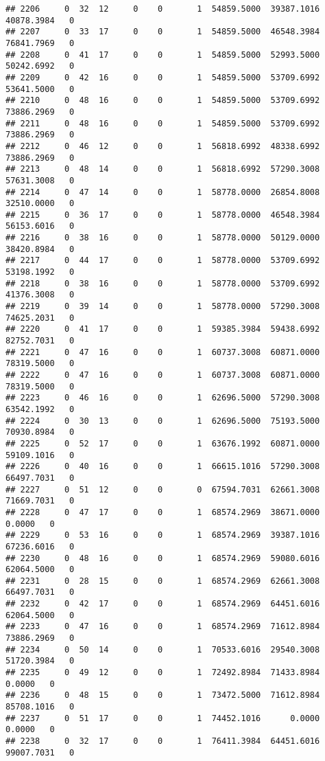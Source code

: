 \documentclass[
]{article}
\begin{document}
\begin{enumerate}
\begin{verbatim}
## 2206     0  32  12     0    0       1  54859.5000  39387.1016  40878.3984   0
## 2207     0  33  17     0    0       1  54859.5000  46548.3984  76841.7969   0
## 2208     0  41  17     0    0       1  54859.5000  52993.5000  50242.6992   0
## 2209     0  42  16     0    0       1  54859.5000  53709.6992  53641.5000   0
## 2210     0  48  16     0    0       1  54859.5000  53709.6992  73886.2969   0
## 2211     0  48  16     0    0       1  54859.5000  53709.6992  73886.2969   0
## 2212     0  46  12     0    0       1  56818.6992  48338.6992  73886.2969   0
## 2213     0  48  14     0    0       1  56818.6992  57290.3008  57631.3008   0
## 2214     0  47  14     0    0       1  58778.0000  26854.8008  32510.0000   0
## 2215     0  36  17     0    0       1  58778.0000  46548.3984  56153.6016   0
## 2216     0  38  16     0    0       1  58778.0000  50129.0000  38420.8984   0
## 2217     0  44  17     0    0       1  58778.0000  53709.6992  53198.1992   0
## 2218     0  38  16     0    0       1  58778.0000  53709.6992  41376.3008   0
## 2219     0  39  14     0    0       1  58778.0000  57290.3008  74625.2031   0
## 2220     0  41  17     0    0       1  59385.3984  59438.6992  82752.7031   0
## 2221     0  47  16     0    0       1  60737.3008  60871.0000  78319.5000   0
## 2222     0  47  16     0    0       1  60737.3008  60871.0000  78319.5000   0
## 2223     0  46  16     0    0       1  62696.5000  57290.3008  63542.1992   0
## 2224     0  30  13     0    0       1  62696.5000  75193.5000  70930.8984   0
## 2225     0  52  17     0    0       1  63676.1992  60871.0000  59109.1016   0
## 2226     0  40  16     0    0       1  66615.1016  57290.3008  66497.7031   0
## 2227     0  51  12     0    0       0  67594.7031  62661.3008  71669.7031   0
## 2228     0  47  17     0    0       1  68574.2969  38671.0000      0.0000   0
## 2229     0  53  16     0    0       1  68574.2969  39387.1016  67236.6016   0
## 2230     0  48  16     0    0       1  68574.2969  59080.6016  62064.5000   0
## 2231     0  28  15     0    0       1  68574.2969  62661.3008  66497.7031   0
## 2232     0  42  17     0    0       1  68574.2969  64451.6016  62064.5000   0
## 2233     0  47  16     0    0       1  68574.2969  71612.8984  73886.2969   0
## 2234     0  50  14     0    0       1  70533.6016  29540.3008  51720.3984   0
## 2235     0  49  12     0    0       1  72492.8984  71433.8984      0.0000   0
## 2236     0  48  15     0    0       1  73472.5000  71612.8984  85708.1016   0
## 2237     0  51  17     0    0       1  74452.1016      0.0000      0.0000   0
## 2238     0  32  17     0    0       1  76411.3984  64451.6016  99007.7031   0

\end{verbatim}
\end{enumerate}
\end{document}
